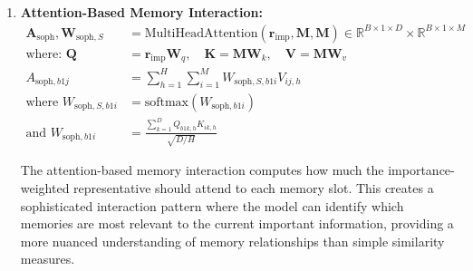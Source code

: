\documentclass{article}
\begin{document}
\begin{enumerate}
\textbf{Role of $\mathbf{W}_{\text{imp},S}$ and $\mathbf{r}_{\text{imp}}$:}
\begin{itemize}
\item \textbf{$\mathbf{W}_{\text{imp},S}$ (importance weights):} Softmax-normalized attention weights that determine how much each sequence position contributes to the representative. Each row sums to 1, creating a probability distribution over sequence positions.
\item \textbf{$\mathbf{r}_{\text{imp}}$ (importance-weighted representative):} A single representative vector per batch item that combines all sequence positions according to their learned importance. This replaces the simple "first token" approach with a learned, context-aware selection mechanism.
\end{itemize}

\item \textbf{Attention-Based Memory Interaction:}
\begin{align}
\mathbf{A}_{\text{soph}}, \mathbf{W}_{\text{soph},S} &= \text{MultiHeadAttention}(\mathbf{r}_{\text{imp}}, \mathbf{M}, \mathbf{M}) \in \mathbb{R}^{B \times 1 \times D} \times \mathbb{R}^{B \times 1 \times M} \\
\text{where: } \mathbf{Q} &= \mathbf{r}_{\text{imp}} \mathbf{W}_q, \quad \mathbf{K} = \mathbf{M} \mathbf{W}_k, \quad \mathbf{V} = \mathbf{M} \mathbf{W}_v \\
A_{\text{soph},b1j} &= \sum_{h=1}^{H} \sum_{i=1}^{M} W_{\text{soph},S,b1i} V_{ij,h} \\
\text{where } W_{\text{soph},S,b1i} &= \text{softmax}(W_{\text{soph},b1i}) \\
\text{and } W_{\text{soph},b1i} &= \frac{\sum_{k=1}^{D} Q_{b1k,h} K_{ik,h}}{\sqrt{D/H}}
\end{align}

The attention-based memory interaction computes how much the importance-weighted representative should attend to each memory slot. This creates a sophisticated interaction pattern where the model can identify which memories are most relevant to the current important information, providing a more nuanced understanding of memory relationships than simple similarity measures.


\end{enumerate}
\end{document}
